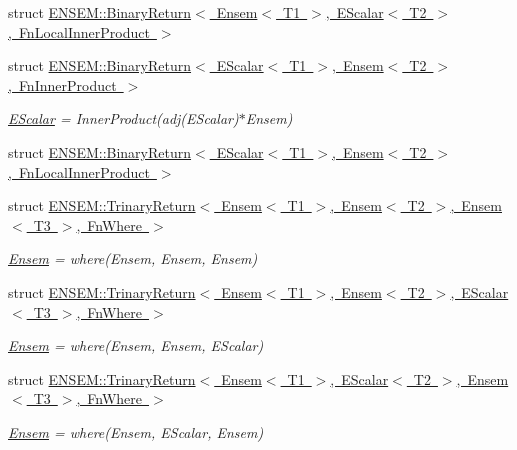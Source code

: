 \begin{DoxyCompactItemize}
struct \mbox{\hyperlink{structENSEM_1_1BinaryReturn_3_01Ensem_3_01T1_01_4_00_01EScalar_3_01T2_01_4_00_01FnLocalInnerProduct_01_4}{E\+N\+S\+E\+M\+::\+Binary\+Return$<$ Ensem$<$ T1 $>$, E\+Scalar$<$ T2 $>$, Fn\+Local\+Inner\+Product $>$}}
\item 
struct \mbox{\hyperlink{structENSEM_1_1BinaryReturn_3_01EScalar_3_01T1_01_4_00_01Ensem_3_01T2_01_4_00_01FnInnerProduct_01_4}{E\+N\+S\+E\+M\+::\+Binary\+Return$<$ E\+Scalar$<$ T1 $>$, Ensem$<$ T2 $>$, Fn\+Inner\+Product $>$}}
\begin{DoxyCompactList}\small\item\em \mbox{\hyperlink{classENSEM_1_1EScalar}{E\+Scalar}} = Inner\+Product(adj(\+E\+Scalar)$\ast$\+Ensem) \end{DoxyCompactList}\item 
struct \mbox{\hyperlink{structENSEM_1_1BinaryReturn_3_01EScalar_3_01T1_01_4_00_01Ensem_3_01T2_01_4_00_01FnLocalInnerProduct_01_4}{E\+N\+S\+E\+M\+::\+Binary\+Return$<$ E\+Scalar$<$ T1 $>$, Ensem$<$ T2 $>$, Fn\+Local\+Inner\+Product $>$}}
\item 
struct \mbox{\hyperlink{structENSEM_1_1TrinaryReturn_3_01Ensem_3_01T1_01_4_00_01Ensem_3_01T2_01_4_00_01Ensem_3_01T3_01_4_00_01FnWhere_01_4}{E\+N\+S\+E\+M\+::\+Trinary\+Return$<$ Ensem$<$ T1 $>$, Ensem$<$ T2 $>$, Ensem$<$ T3 $>$, Fn\+Where $>$}}
\begin{DoxyCompactList}\small\item\em \mbox{\hyperlink{classENSEM_1_1Ensem}{Ensem}} = where(\+Ensem, Ensem, Ensem) \end{DoxyCompactList}\item 
struct \mbox{\hyperlink{structENSEM_1_1TrinaryReturn_3_01Ensem_3_01T1_01_4_00_01Ensem_3_01T2_01_4_00_01EScalar_3_01T3_01_4_00_01FnWhere_01_4}{E\+N\+S\+E\+M\+::\+Trinary\+Return$<$ Ensem$<$ T1 $>$, Ensem$<$ T2 $>$, E\+Scalar$<$ T3 $>$, Fn\+Where $>$}}
\begin{DoxyCompactList}\small\item\em \mbox{\hyperlink{classENSEM_1_1Ensem}{Ensem}} = where(\+Ensem, Ensem, E\+Scalar) \end{DoxyCompactList}\item 
struct \mbox{\hyperlink{structENSEM_1_1TrinaryReturn_3_01Ensem_3_01T1_01_4_00_01EScalar_3_01T2_01_4_00_01Ensem_3_01T3_01_4_00_01FnWhere_01_4}{E\+N\+S\+E\+M\+::\+Trinary\+Return$<$ Ensem$<$ T1 $>$, E\+Scalar$<$ T2 $>$, Ensem$<$ T3 $>$, Fn\+Where $>$}}
\begin{DoxyCompactList}\small\item\em \mbox{\hyperlink{classENSEM_1_1Ensem}{Ensem}} = where(\+Ensem, E\+Scalar, Ensem) \end{DoxyCompactList}\item 

\end{DoxyCompactItemize}
